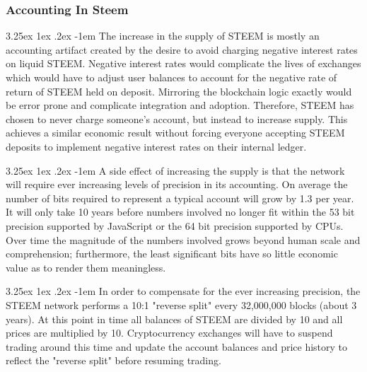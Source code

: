 \documentclass{article}
\makeatletter
\renewcommand\paragraph{\@startsection{paragraph}{5}{\z@}%
  {3.25ex \@plus1ex \@minus.2ex}%
  {-1em}%
  {\normalfont\normalsize\bfseries}}
\makeatother
\begin{document}
            \subsubsection{Accounting In Steem}

                \paragraph{}
                    The increase in the supply of STEEM is mostly an
accounting artifact created by the desire to avoid charging negative
interest rates on liquid STEEM. Negative interest rates would complicate
the lives of exchanges which would have to adjust user balances to account
for the negative rate of return of STEEM held on deposit. Mirroring the
blockchain logic exactly would be error prone and complicate integration
and adoption. Therefore, STEEM has chosen to never charge someone's
account, but instead to increase supply. This achieves a similar economic
result without forcing everyone accepting STEEM deposits to implement
negative interest rates on their internal ledger.

                \paragraph{}
                    A side effect of increasing the supply is that the
network will require ever increasing levels of precision in its accounting.
On average the number of bits required to represent a typical account will
grow by 1.3 per year. It will only take 10 years before numbers involved
no longer fit within the 53 bit precision supported by JavaScript or the 64
bit precision supported by CPUs. Over time the magnitude of the numbers
involved grows beyond human scale and comprehension; furthermore, the least
significant bits have so little economic value as to render them
meaningless.

                \paragraph{}
                    In order to compensate for the ever increasing
precision, the STEEM network performs a 10:1 "reverse split" every
32,000,000 blocks (about 3 years). At this point in time all balances of
STEEM are divided by 10 and all prices are multiplied by 10. Cryptocurrency
exchanges will have to suspend trading around this time and update the
account balances and price history to reflect the "reverse split" before
resuming trading.
\end{document}
